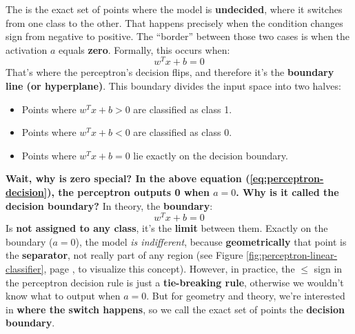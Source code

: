 \highspace
The  is the exact set of points where the model is \textbf{undecided}, where it switches from one class to the other. That happens precisely when the condition changes sign from negative to positive. The ``border'' between those two cases is when the activation $a$ equals \textbf{zero}. Formally, this occurs when:
\begin{equation*}
    w^{T} x + b = 0
\end{equation*}
That's where the perceptron's decision flips, and therefore it's the \textbf{boundary line (or hyperplane)}. This boundary divides the input space into two halves:
\begin{itemize}
    \item Points where \( w^{T} x + b > 0 \) are classified as class 1.
    \item Points where \( w^{T} x + b < 0 \) are classified as class 0.
    \item Points where \( w^{T} x + b = 0 \) lie exactly on the decision boundary.
\end{itemize}
\textcolor{Green3}{ \textbf{Wait, why is zero special? In the above equation (\ref{eq:perceptron-decision}), the perceptron outputs 0 when $a = 0$. Why is it called the decision boundary?}} In theory, the \textbf{boundary}:
\begin{equation*}
    w^{T} x + b = 0
\end{equation*}
Is \textbf{not assigned to any class}, it's the \textbf{limit} between them. Exactly on the boundary ($a=0$), the model \emph{is indifferent}, because \textbf{geometrically} that point is the \textbf{separator}, not really part of any region (see Figure \ref{fig:perceptron-linear-classifier}, page \pageref{fig:perceptron-linear-classifier}, to visualize this concept). However, in practice, the $\le$ sign in the perceptron decision rule is just a \textbf{tie-breaking rule}, otherwise we wouldn't know what to output when $a=0$. But for geometry and theory, we're interested in \textbf{where the switch happens}, so we call the exact set of points the \textbf{decision boundary}.


